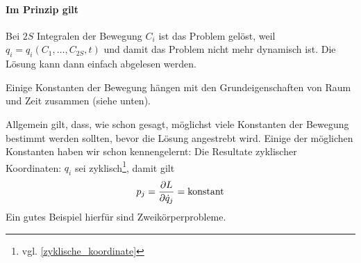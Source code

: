 \paragraph{Im Prinzip gilt} Bei $2S$ Integralen der Bewegung $C_i$ ist das Problem gelöst, weil $q_i = q_i(C_1, \dots, C_{2S}, t)$ und damit das Problem nicht mehr dynamisch ist. Die Lösung kann dann einfach abgelesen werden.

Einige Konstanten der Bewegung hängen mit den Grundeigenschaften von Raum und Zeit zusammen (siehe unten).

Allgemein gilt, dass, wie schon gesagt, möglichst viele Konstanten der Bewegung bestimmt werden sollten, bevor die Lösung angestrebt wird. Einige der möglichen Konstanten haben wir schon kennengelernt: Die Resultate zyklischer Koordinaten: $q_i$ sei zyklisch\footnote{vgl. \ref{zyklische_koordinate}}, damit gilt
$$p_j = \frac{\partial L}{\partial \dot{q}_j} = \text{konstant}$$
Ein gutes Beispiel hierfür sind Zweikörperprobleme.

